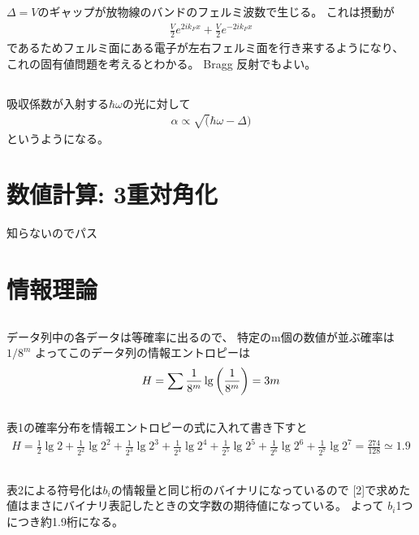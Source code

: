 \documentclass[../../master.tex]{subfiles}
\begin{document}
\section{}
\(\Delta = V\)のギャップが放物線のバンドのフェルミ波数で生じる。
これは摂動が
\begin{align}
    \frac{V}{2}e^{2ik_Fx} + \frac{V}{2}e^{-2ik_Fx}
\end{align}
であるためフェルミ面にある電子が左右フェルミ面を行き来するようになり、
これの固有値問題を考えるとわかる。
Bragg 反射でもよい。

\section{}
吸収係数が入射する\(\hbar\omega\)の光に対して
\begin{align}
    \alpha \propto \sqrt(\hbar\omega -\Delta)
\end{align}
というようになる。

\chapter{数値計算: 3重対角化}
知らないのでパス

\chapter{情報理論}
\section{}
データ列中の各データは等確率に出るので、
特定のm個の数値が並ぶ確率は\(1/8^m\)
よってこのデータ列の情報エントロピーは
\begin{align}
    H =\sum \frac{1}{8^m}\lg\qty(\frac{1}{8^m}) = 3m
\end{align}

\section{}
表1の確率分布を情報エントロピーの式に入れて書き下すと
\begin{align}
    H = \frac{1}{2}\lg2
    +\frac{1}{2^2}\lg2^2
    +\frac{1}{2^3}\lg2^3
    +\frac{1}{2^4}\lg2^4
    +\frac{1}{2^5}\lg2^5
    +\frac{1}{2^6}\lg2^6
    +\frac{1}{2^7}\lg2^7
    =\frac{274}{128}\simeq 1.9
\end{align}
\section{}
表2による符号化は\(b_i\)の情報量と同じ桁のバイナリになっているので
[2]で求めた値はまさにバイナリ表記したときの文字数の期待値になっている。
よって \(b_i\)1つにつき約1.9桁になる。
\end{document}
